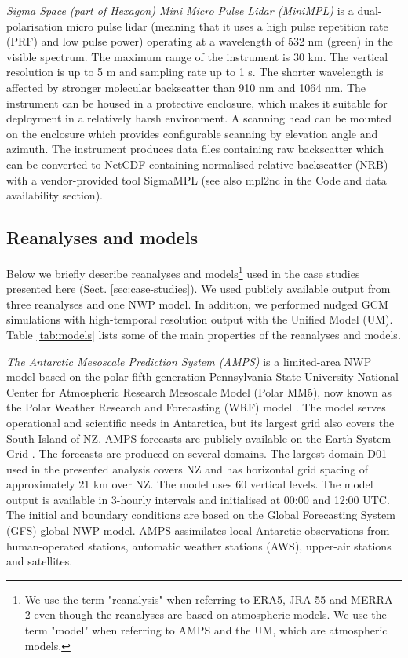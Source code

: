 \textit{Sigma Space (part of Hexagon) Mini Micro Pulse Lidar (MiniMPL)} \citep{spinhirne1993,campbell2002,flynn2007} is a
dual-polarisation micro pulse lidar (meaning that it uses a high pulse repetition rate (PRF) and low pulse power)
operating at a wavelength of 532 nm (green) in the visible spectrum. The maximum range of the
instrument is 30 km. The vertical resolution is up to 5 m and sampling rate up
to 1 s. The shorter wavelength is affected
by stronger molecular backscatter than 910 nm and 1064 nm.
The instrument can be housed in a protective enclosure, which makes it suitable
for deployment in a relatively harsh environment. A scanning head can be
mounted on the enclosure which provides configurable scanning by elevation
angle and azimuth. The instrument produces data files containing raw
backscatter which can be converted to NetCDF containing normalised relative
backscatter (NRB) with a vendor-provided tool SigmaMPL
(see also mpl2nc in the Code and data availability section).

\subsection{Reanalyses and models}
\label{sec:reanalyses-and-models}

Below we briefly describe reanalyses and models\footnote{We use the term "reanalysis" when referring to ERA5, JRA-55 and MERRA-2 even though the reanalyses are based on atmospheric models. We use the term "model" when referring to AMPS and the UM, which are atmospheric models.} used in the case studies
presented here (Sect. \ref{sec:case-studies}). We used publicly available output from three reanalyses and one NWP model. In addition, we performed nudged GCM simulations with
high-temporal resolution output with the Unified Model (UM).
Table \ref{tab:models} lists some of the main properties of the reanalyses and
models.

\textit{The Antarctic Mesoscale Prediction System (AMPS)} \citep{powers2003}
is a limited-area NWP model based on the polar fifth-generation Pennsylvania State
University-National Center for Atmospheric Research Mesoscale Model (Polar MM5),
now known as the Polar Weather Research and Forecasting (WRF) model \citep{hines2008}.
The model serves operational and scientific needs in Antarctica, but its largest grid also covers the South Island of NZ.
AMPS forecasts are publicly available on the Earth System Grid \citep{williams2009}.
The forecasts are produced on several domains. The largest domain D01 used in the presented analysis covers
NZ and has horizontal grid spacing of approximately 21 km over NZ. The model uses 60 vertical levels. The model output is available
in 3-hourly intervals and initialised at 00:00 and 12:00 UTC. The initial and
boundary conditions are based on the Global Forecasting System (GFS) global
NWP model. AMPS assimilates local Antarctic observations from human-operated stations, automatic
weather stations (AWS), upper-air stations and satellites.


